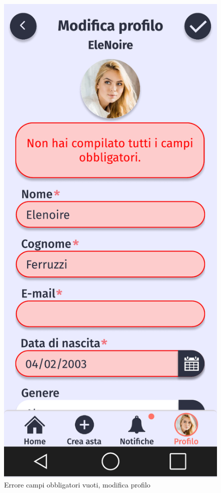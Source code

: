 \begin{figure}[!htb]
\begin{minipage}{0.32\textwidth}
            \includegraphics[width=.7\linewidth]{Immagini/Frames/Errori/E13.pdf}
            \caption{Errore campi obbligatori vuoti, modifica profilo}
        \end{minipage}\hfill
        \begin{minipage}{0.32\textwidth}
            \centering

\end{minipage}
\end{figure}
